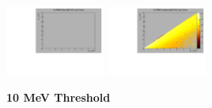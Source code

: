 \begin{center}
  \includegraphics[width=0.245\textwidth]{plots/response_matrix/Total_RHC_CCInc_null.pdf}
  \includegraphics[width=0.245\textwidth]{plots/response_matrix/Hadrons_RHC_CCInc_null.pdf}

\end{center}

\textbf{10 MeV Threshold}

